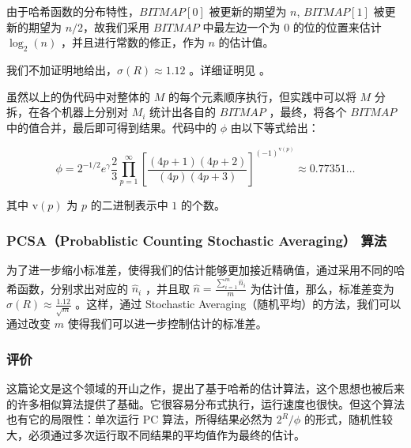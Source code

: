 \documentclass{ctexart}
\begin{document}
    由于哈希函数的分布特性，$BITMAP[0]$ 被更新的期望为 $n$, $BITMAP[1]$ 被更新的期望为 $n / 2$，故我们采用 $BITMAP$ 中最左边一个为 $0$ 的位的位置来估计 $\log_2(n)$ ，并且进行常数的修正，作为 $n$ 的估计值。

    我们不加证明地给出，$\sigma(R) \approx 1.12$ 。详细证明见 \cite{Flajolet:1985ixa} 。

    虽然以上的伪代码中对整体的 $M$ 的每个元素顺序执行，但实践中可以将 $M$ 分拆，在各个机器上分别对 $M_i$ 统计出各自的 $BITMAP$ ，最终，将各个 $BITMAP$ 中的值合并，最后即可得到结果。代码中的 $\phi$ 由以下等式给出：

    \begin{equation*}
        \phi = 2^{-1/2}e^{\gamma}\frac23\prod_{p=1}^{\infty}\left[\frac{(4p+1)(4p+2)}{(4p)(4p+3)}\right]^{(-1)^{\mathrm{v}(p)}} \approx 0.77351 \ldots
    \end{equation*}

    其中 $\mathrm{v}(p)$ 为 $p$ 的二进制表示中 $1$ 的个数。

\subsubsection{PCSA（Probablistic Counting Stochastic Averaging） 算法}

    为了进一步缩小标准差，使得我们的估计能够更加接近精确值，通过采用不同的哈希函数，分别求出对应的 $\hat{n}_i$ ，并且取 $\hat{n} = \frac{\sum_{i=1}^m{\hat{n}_i}}{m}$ 为估计值，那么，标准差变为 $\sigma(R) \approx \frac{1.12}{\sqrt{m}}$ 。这样，通过 Stochastic Averaging（随机平均）的方法，我们可以通过改变 $m$ 使得我们可以进一步控制估计的标准差。

\subsubsection{评价}
    这篇论文是这个领域的开山之作，提出了基于哈希的估计算法，这个思想也被后来的许多相似算法提供了基础。它很容易分布式执行，运行速度也很快。但这个算法也有它的局限性：单次运行 PC 算法，所得结果必然为 $2^R/\phi$ 的形式，随机性较大，必须通过多次运行取不同结果的平均值作为最终的估计。

\printbibliography[title=引用文献]
\end{document}
